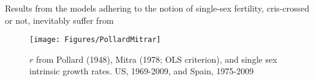 
Results from the models adhering to the notion of single-sex fertility,
cris-crossed or not, inevitably suffer from 

\begin{figure}[ht!]
        \centering  
          \caption{$r$ from Pollard (1948), Mitra (1978; OLS criterion),
          and single sex intrinsic growth rates. US, 1969-2009, and Spain, 1975-2009}
           \texttt{[image: Figures/PollardMitrar]}
          \label{fig:Mitra1978v0vstar}
\end{figure}












